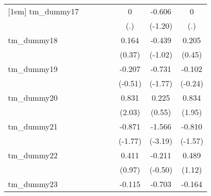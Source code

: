 {\begin{tabular}{l*{7}{c}}
[1em]
tm\_dummy17  &                     &                     &                     &                     &           0         &      -0.606         &           0         \\
            &                     &                     &                     &                     &         (.)         &     (-1.20)         &         (.)         \\
[1em]
tm\_dummy18  &                     &                     &                     &                     &       0.164         &      -0.439         &       0.205         \\
            &                     &                     &                     &                     &      (0.37)         &     (-1.02)         &      (0.45)         \\
[1em]
tm\_dummy19  &                     &                     &                     &                     &      -0.207         &      -0.731         &      -0.102         \\
            &                     &                     &                     &                     &     (-0.51)         &     (-1.77)         &     (-0.24)         \\
[1em]
tm\_dummy20  &                     &                     &                     &                     &       0.831\sym{*}  &       0.225         &       0.834         \\
            &                     &                     &                     &                     &      (2.03)         &      (0.55)         &      (1.95)         \\
[1em]
tm\_dummy21  &                     &                     &                     &                     &      -0.871         &      -1.566\sym{**} &      -0.810         \\
            &                     &                     &                     &                     &     (-1.77)         &     (-3.19)         &     (-1.57)         \\
[1em]
tm\_dummy22  &                     &                     &                     &                     &       0.411         &      -0.211         &       0.489         \\
            &                     &                     &                     &                     &      (0.97)         &     (-0.50)         &      (1.12)         \\
[1em]
tm\_dummy23  &                     &                     &                     &                     &      -0.115         &      -0.703         &      -0.164         \\

\end{tabular}}
